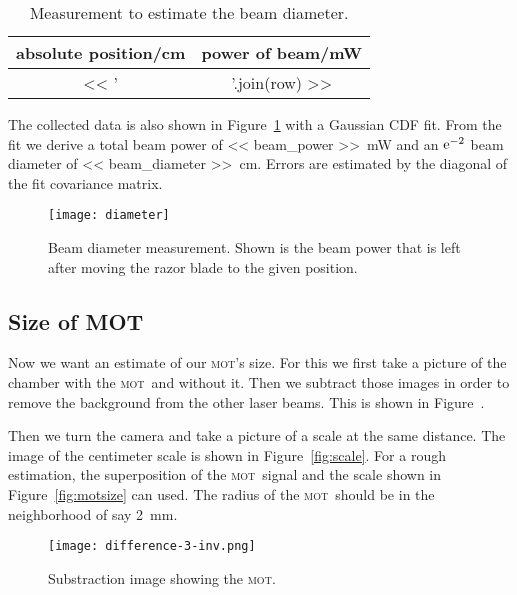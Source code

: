 \documentclass[11pt, english, fleqn, DIV=15, headinclude, BCOR=2cm]{scrreprt}
\newcommand\mot{\textsc{mot}}
\begin{document}
\begin{table}
    \centering
    \begin{tabular}{SS}
        \toprule
        {absolute position/\si{\centi\meter}}
        & {power of beam/\si{\milli\watt}} \\
        \midrule
        << ' & '.join(row) >> \\
        \bottomrule
    \end{tabular}
    \caption{%
        Measurement to estimate the beam diameter.
    }
    \label{tab:beam_diameter}
\end{table}

The collected data is also shown in Figure~\ref{fig:diameter} with a Gaussian
CDF fit. From the fit we derive a total beam power of \SI{<< beam_power
>>}{\milli\watt} and an $\mathrm e^{-2}$ beam diameter of \SI{<< beam_diameter
>>}{\centi\meter}. Errors are estimated by the diagonal of the fit covariance
matrix.

\begin{figure}
    \centering
    \texttt{[image: diameter]}
    \caption{%
        Beam diameter measurement. Shown is the beam power that is left after
        moving the razor blade to the given position.
    }
    \label{fig:diameter}
\end{figure}


\subsection{Size of MOT}

Now we want an estimate of our \mot's size. For this we first take a picture of
the chamber with the \mot\ and without it. Then we subtract those images in
order to remove the background from the other laser beams. This is shown in
Figure~\label{fig:difference-3-inv}.

Then we turn the camera and take a picture of a scale at the same distance. The
image of the centimeter scale is shown in Figure~\ref{fig:scale}. For a rough
estimation, the superposition of the \mot\ signal and the scale shown in
Figure~\ref{fig:motsize} can used. The radius of the \mot\ should be in the
neighborhood of say \SI{2}{\milli\meter}.

\begin{figure}
    \centering
    \texttt{[image: difference-3-inv.png]}
    \caption{Substraction image showing the \mot.}
    \label{fig:difference-3-inv}
\end{figure}
\end{document}

